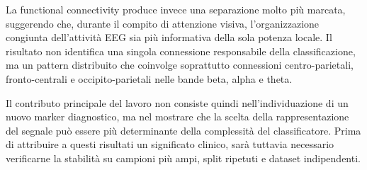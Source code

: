 La functional connectivity produce invece una separazione molto più
marcata, suggerendo che, durante il compito di attenzione visiva,
l'organizzazione congiunta dell'attività EEG sia più informativa della
sola potenza locale. Il risultato non identifica una singola
connessione responsabile della classificazione, ma un pattern
distribuito che coinvolge soprattutto connessioni centro-parietali,
fronto-centrali e occipito-parietali nelle bande beta, alpha e theta.

Il contributo principale del lavoro non consiste quindi
nell'individuazione di un nuovo marker diagnostico, ma nel mostrare
che la scelta della rappresentazione del segnale può essere più
determinante della complessità del classificatore. Prima di attribuire
a questi risultati un significato clinico, sarà tuttavia necessario
verificarne la stabilità su campioni più ampi, split ripetuti e dataset
indipendenti.